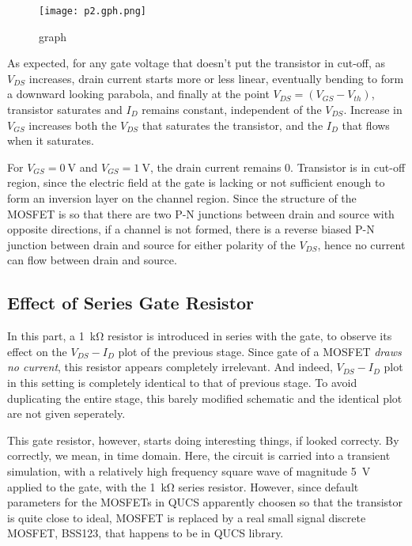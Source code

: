\documentclass[../main.tex]{subfiles}
\begin{document}
        \begin{figure}[H]\centering
            \texttt{[image: p2.gph.png]}
            \caption{graph}\label{fig:p2.gph}
        \end{figure}

        As expected, for any gate voltage that doesn't put the transistor in cut-off, as $V_{DS}$ increases, drain current 
        starts more or less linear, eventually bending to form a downward looking parabola, and finally at the point
        $V_{DS}=(V_{GS}-V_{th})$, transistor saturates and $I_D$ remains constant, independent of the $V_{DS}$. 
        Increase in $V_{GS}$ increases both the $V_{DS}$ that saturates the transistor, and the $I_D$ that flows
        when it saturates. 

        For $V_{GS}=\SI{0}{\volt}$ and $V_{GS}=\SI{1}{\volt}$, the drain current remains 0. Transistor is in cut-off
        region, since the electric field at the gate is lacking or not sufficient enough to form an inversion layer 
        on the channel region. Since the structure of the MOSFET is so that there are two P-N junctions between 
        drain and source with opposite directions, if a channel is not formed, there is a reverse biased P-N junction
        between drain and source for either polarity of the $V_{DS}$, hence no current can flow between drain and source.

    \pagebreak


    \subsection{Effect of Series Gate Resistor}
        In this part, a \SI{1}{\kilo\ohm} resistor is introduced in series with the gate, to observe its 
        effect on the $V_{DS}-I_D$ plot of the previous stage. Since gate of a MOSFET \textit{draws no current},
        this resistor appears completely irrelevant. And indeed, $V_{DS}-I_D$ plot in this setting is completely 
        identical to that of previous stage. To avoid duplicating the entire stage, this barely modified 
        schematic and the identical plot are not given seperately.

        This gate resistor, however, starts doing interesting things, if looked correcty. By correctly, we mean, 
        in time domain. Here, the circuit is carried into a transient simulation, with a relatively high frequency
        square wave of magnitude \SI{5}{\volt} applied to the gate, with the \SI{1}{\kilo\ohm} series resistor.
        However, since default parameters for the MOSFETs in QUCS apparently choosen so that the transistor 
        is quite close to ideal\footnotemark, MOSFET is replaced by a real small signal discrete MOSFET, BSS123, that 
        happens to be in QUCS library.
\end{document}
